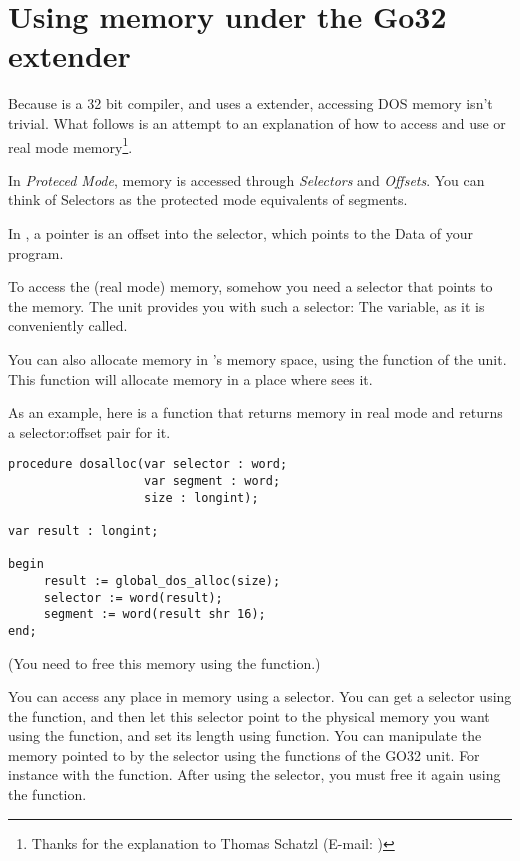 \section{Using \dos memory under the Go32 extender}
\label{se:AccessingDosMemory}

Because \fpc is a 32 bit compiler, and uses a \dos extender, accessing DOS
memory isn't trivial. What follows is an attempt to an explanation of how to
access and use \dos or real mode memory\footnote{Thanks for the explanation to
Thomas Schatzl (E-mail: )}.

In {\em Proteced Mode}, memory is accessed through {\em Selectors} and
{\em Offsets}. You can think of Selectors as the protected mode
equivalents of segments.

In \fpc, a pointer is an offset into the  selector, which points to
the Data of your program.

To access the (real mode) \dos memory, somehow you need a selector that
points to the \dos memory.
The  unit provides you with such a selector: The
 variable, as it is conveniently called.

You can also allocate memory in \dos's memory space, using the
 function of the  unit.
This function will allocate memory in a place where \dos sees it.

As an example, here is a function that returns memory in real mode \dos and
returns a selector:offset pair for it.
\begin{verbatim}
procedure dosalloc(var selector : word;
                   var segment : word;
                   size : longint);

var result : longint;

begin
     result := global_dos_alloc(size);
     selector := word(result);
     segment := word(result shr 16);
end;
\end{verbatim}
(You need to free this memory using the  function.)

You can access any place in memory using a selector. You can get a selector
using the  function, and then let this selector
point to the physical memory you want using the
 function, and set its length using
 function.
You can manipulate the memory pointed to by the selector using the functions
of the GO32 unit. For instance with the  function.
After using the selector, you must free it again using the
 function.

